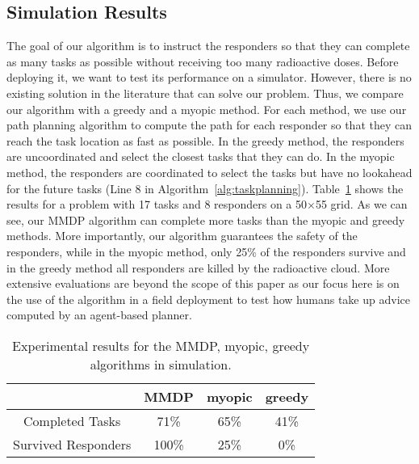\subsection{Simulation Results}



\noindent The goal of our algorithm is to instruct the responders
so that they can complete as many tasks as possible without
receiving too many radioactive doses. Before deploying it, we want
to test its performance on a simulator. However, there is no
existing solution in the literature that can solve our problem.
Thus, we compare our algorithm with a greedy and a myopic method.
For each method, we use our path planning algorithm to compute the
path for each responder so that they can reach the task location as
fast as possible. In the greedy method, the responders are
uncoordinated and select the closest tasks that they can do. In the
myopic method, the responders are coordinated to select the tasks
but have no lookahead for the future tasks (Line 8 in
Algorithm~\ref{alg:taskplanning}). Table~\ref{tab:simulation} shows
the results for a problem with 17 tasks and 8 responders on a
50$\times$55 grid. As we can see, our MMDP algorithm can complete
more tasks than the myopic and greedy methods. More importantly,
our algorithm guarantees the safety of the responders, while in the
myopic method, only 25\% of the responders survive and in the
greedy method all responders are killed by the radioactive cloud.
More extensive evaluations are beyond the scope of this paper as
our focus here is on the use of the algorithm in a field deployment
to test how humans take up advice computed by an agent-based
planner.

\begin{table}[htbp]
  \centering
  \caption{Experimental results for the MMDP, myopic, greedy
  algorithms in simulation.}
  \begin{tabular}{c|c|c|c}
   & MMDP & myopic & greedy \\
  \hline
  Completed Tasks & 71\% & 65\% & 41\% \\
  \hline
  Survived Responders & 100\% & 25\% & 0\% \\
  \end{tabular}
  \label{tab:simulation}\vspace{-3mm}
\end{table}
